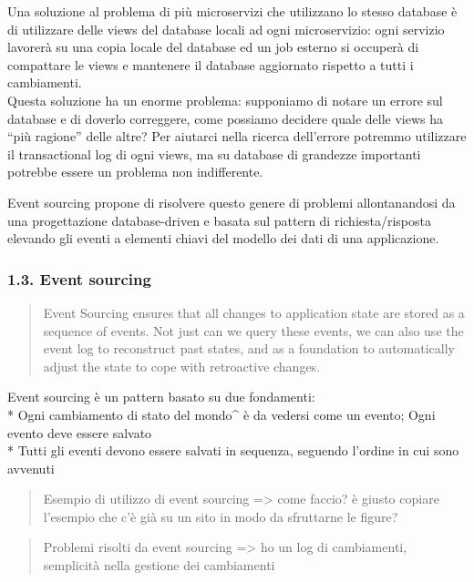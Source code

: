 \documentclass[]{article}
\begin{document}
Una soluzione al problema di più microservizi che utilizzano lo stesso
database è di utilizzare delle views del database locali ad ogni
microservizio: ogni servizio lavorerà su una copia locale del database
ed un job esterno si occuperà di compattare le views e mantenere il
database aggiornato rispetto a tutti i cambiamenti.\\
Questa soluzione ha un enorme problema: supponiamo di notare un errore
sul database e di doverlo correggere, come possiamo decidere quale delle
views ha ``più ragione'' delle altre? Per aiutarci nella ricerca
dell'errore potremmo utilizzare il transactional log di ogni views, ma
su database di grandezze importanti potrebbe essere un problema non
indifferente.

Event sourcing propone di risolvere questo genere di problemi
allontanandosi da una progettazione database-driven e basata sul pattern
di richiesta/risposta elevando gli eventi a elementi chiavi del modello
dei dati di una applicazione.

\subsubsection{1.3. Event sourcing}\label{event-sourcing}

\begin{quote}
Event Sourcing ensures that all changes to application state are stored
as a sequence of events. Not just can we query these events, we can also
use the event log to reconstruct past states, and as a foundation to
automatically adjust the state to cope with retroactive changes.
\end{quote}

Event sourcing è un pattern basato su due fondamenti:\\
* Ogni cambiamento di stato del mondo\^{} è da vedersi come un evento;
Ogni evento deve essere salvato\\
* Tutti gli eventi devono essere salvati in sequenza, seguendo l'ordine
in cui sono avvenuti

\begin{quote}
Esempio di utilizzo di event sourcing =\textgreater{} come faccio? è
giusto copiare l'esempio che c'è già su un sito in modo da sfruttarne le
figure?
\end{quote}

\begin{quote}
Problemi risolti da event sourcing =\textgreater{} ho un log di
cambiamenti, semplicità nella gestione dei cambiamenti
\end{quote}
\end{document}
